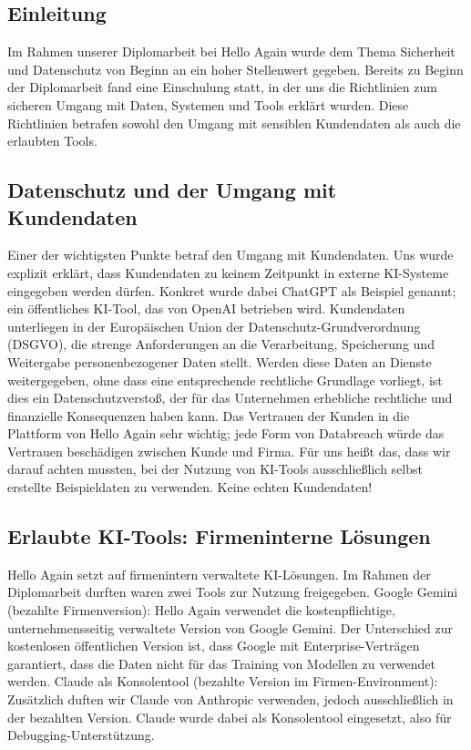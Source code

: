 \subsection{Einleitung}

Im Rahmen unserer Diplomarbeit bei Hello Again wurde dem Thema Sicherheit und Datenschutz von Beginn an ein hoher Stellenwert gegeben.
Bereits zu Beginn der Diplomarbeit fand eine Einschulung statt, in der uns die Richtlinien zum sicheren Umgang mit Daten, Systemen und Tools erklärt wurden.
Diese Richtlinien betrafen sowohl den Umgang mit sensiblen Kundendaten als auch die erlaubten Tools.

\subsection{Datenschutz und der Umgang mit Kundendaten}

Einer der wichtigsten Punkte betraf den Umgang mit Kundendaten.
Uns wurde explizit erklärt, dass Kundendaten zu keinem Zeitpunkt in externe KI-Systeme eingegeben werden dürfen.
Konkret wurde dabei ChatGPT als Beispiel genannt; ein öffentliches KI-Tool, das von OpenAI betrieben wird.
Kundendaten unterliegen in der Europäischen Union der Datenschutz-Grundverordnung (DSGVO), die strenge Anforderungen an die Verarbeitung, Speicherung und Weitergabe personenbezogener Daten stellt.
Werden diese Daten an Dienste weitergegeben, ohne dass eine entsprechende rechtliche Grundlage vorliegt, ist dies ein Datenschutzverstoß, der für das Unternehmen erhebliche rechtliche und finanzielle Konsequenzen haben kann.
Das Vertrauen der Kunden in die Plattform von Hello Again sehr wichtig; jede Form von Databreach würde das Vertrauen beschädigen zwischen Kunde und Firma.
Für uns heißt das, dass wir darauf achten mussten, bei der Nutzung von KI-Tools ausschließlich selbst erstellte Beispieldaten zu verwenden.
Keine echten Kundendaten!


\subsection{Erlaubte KI-Tools: Firmeninterne Lösungen}

Hello Again setzt auf firmenintern verwaltete KI-Lösungen.
Im Rahmen der Diplomarbeit durften waren zwei Tools zur Nutzung freigegeben.
Google Gemini (bezahlte Firmenversion): Hello Again verwendet die kostenpflichtige, unternehmensseitig verwaltete Version von Google Gemini.
Der Unterschied zur kostenlosen öffentlichen Version ist, dass Google mit Enterprise-Verträgen garantiert, dass die Daten nicht für das Training von Modellen zu verwendet werden.
Claude als Konsolentool (bezahlte Version im Firmen-Environment): Zusätzlich duften wir Claude von Anthropic verwenden, jedoch ausschließlich in der bezahlten Version.
Claude wurde dabei als Konsolentool eingesetzt, also für Debugging-Unterstützung.

